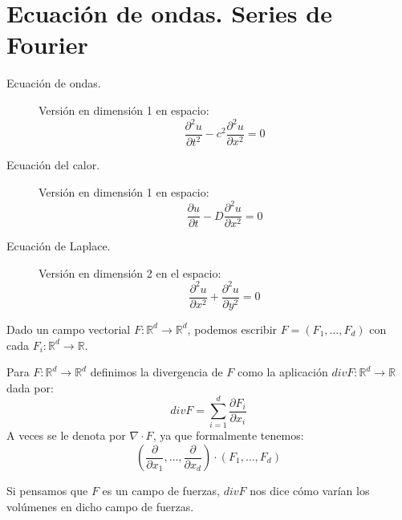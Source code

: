 \chapter{Ecuación de ondas. Series de Fourier}
\begin{description}
    \item [Ecuación de ondas.] Versión en dimensión 1 en espacio:
        \begin{equation*}
            \frac{\partial^2 u}{\partial t^2} - c^2 \frac{\partial^2 u}{\partial x^2} = 0
        \end{equation*}
    \item [Ecuación del calor.] Versión en dimensión 1 en espacio:
        \begin{equation*}
            \frac{\partial u}{\partial t} - D\frac{\partial^2 u}{\partial x^2} = 0
        \end{equation*}
    \item [Ecuación de Laplace.] Versión en dimensión 2 en el espacio:
        \begin{equation*}
            \frac{\partial^2 u}{\partial x^2} + \frac{\partial^2 u}{\partial y^2} = 0
        \end{equation*}
\end{description}
Dado un campo vectorial $F:\mathbb{R}^d\to \mathbb{R}^d$, podemos escribir $F=(F_1,\ldots,F_d)$ con cada $F_i:\mathbb{R}^d\to \mathbb{R}$.

\begin{definicion}
    Para $F:\mathbb{R}^d\to \mathbb{R}^d$ definimos la divergencia de $F$ como la aplicación $div F:\mathbb{R}^d\to \mathbb{R}$ dada por:
    \begin{equation*}
        div F = \sum_{i=1}^{d} \frac{\partial F_i}{\partial x_i}
    \end{equation*}
    A veces se le denota por $\nabla\cdot F$, ya que formalmente tenemos:
    \begin{equation*}
        \left(\frac{\partial }{\partial x_1}, \ldots, \frac{\partial }{\partial x_d}\right) \cdot (F_1,\ldots,F_d)
    \end{equation*}
\end{definicion}

\noindent
Si pensamos que $F$ es un campo de fuerzas, $div F$ nos dice cómo varían los volúmenes en dicho campo de fuerzas.

